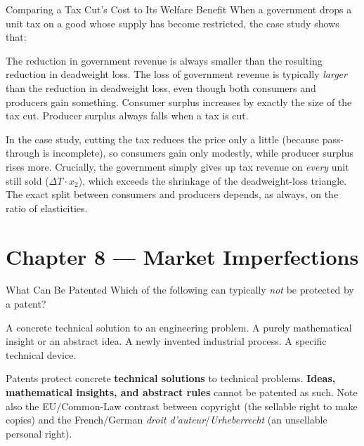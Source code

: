 \begin{question}[type=mc]{Comparing a Tax Cut's Cost to Its Welfare Benefit}
When a government drops a unit tax on a good whose supply has become
restricted, the case study shows that:
\begin{choices}
  \choice        The reduction in government revenue is always smaller than
                 the resulting reduction in deadweight loss.
  \correctchoice The loss of government revenue is typically \emph{larger}
                 than the reduction in deadweight loss, even though both
                 consumers and producers gain something.
  \choice        Consumer surplus increases by exactly the size of the tax
                 cut.
  \choice        Producer surplus always falls when a tax is cut.
\end{choices}
\begin{solution}
  In the case study, cutting the tax reduces the price only a little
  (because pass-through is incomplete), so consumers gain only modestly,
  while producer surplus rises more. Crucially, the government simply gives
  up tax revenue on \emph{every} unit still sold ($\Delta T \cdot x_2$),
  which exceeds the shrinkage of the deadweight-loss triangle. The exact
  split between consumers and producers depends, as always, on the ratio of
  elasticities.
\end{solution}
\end{question}


\section{Chapter 8 — Market Imperfections}

\begin{question}[type=mc]{What Can Be Patented}
Which of the following can typically \emph{not} be protected by a patent?
\begin{choices}
  \choice        A concrete technical solution to an engineering problem.
  \correctchoice A purely mathematical insight or an abstract idea.
  \choice        A newly invented industrial process.
  \choice        A specific technical device.
\end{choices}
\begin{solution}
  Patents protect concrete \textbf{technical solutions} to technical
  problems. \textbf{Ideas, mathematical insights, and abstract rules} cannot
  be patented as such. Note also the EU/Common-Law contrast between
  copyright (the sellable right to make copies) and the French/German
  \emph{droit d'auteur}/\emph{Urheberrecht} (an unsellable personal right).
\end{solution}
\end{question}


